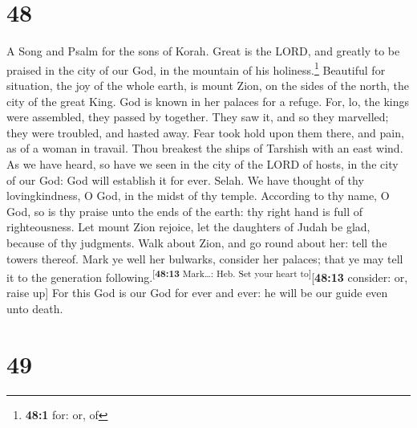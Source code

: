 \hypertarget{section-47}{%
\section{48}\label{section-47}}

A Song and Psalm for the sons of Korah.  Great is the
LORD, and greatly to be praised in the city of our God, in the mountain
of his holiness.\footnote{\textbf{48:1} for: or, of} 
Beautiful for situation, the joy of the whole earth, is mount Zion, on
the sides of the north, the city of the great King.  God
is known in her palaces for a refuge.  For, lo, the kings
were assembled, they passed by together.  They saw it, and
so they marvelled; they were troubled, and hasted away. 
Fear took hold upon them there, and pain, as of a woman in travail.
 Thou breakest the ships of Tarshish with an east wind.
 As we have heard, so have we seen in the city of the LORD
of hosts, in the city of our God: God will establish it for ever. Selah.
 We have thought of thy lovingkindness, O God, in the
midst of thy temple.  According to thy name, O God, so is
thy praise unto the ends of the earth: thy right hand is full of
righteousness.  Let mount Zion rejoice, let the daughters
of Judah be glad, because of thy judgments.  Walk about
Zion, and go round about her: tell the towers thereof. 
Mark ye well her bulwarks, consider her palaces; that ye may tell it to
the generation following.\textsuperscript{{[}\textbf{48:13} Mark\ldots:
Heb. Set your heart to{]}}{[}\textbf{48:13} consider: or, raise up{]}
 For this God is our God for ever and ever: he will be
our guide even unto death.

\hypertarget{section-48}{%
\section{49}\label{section-48}}

